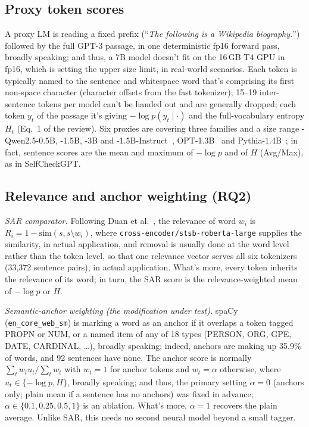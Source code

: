\documentclass[acmsmall,screen,review,nonacm]{acmart}
\begin{document}
\subsection{Proxy token scores}
A proxy LM is reading a fixed prefix (\textquotedblleft\textit{The following is a Wikipedia biography.}\textquotedblright) followed by the full GPT-3 passage, in one deterministic fp16 forward pass, broadly speaking; and thus, a 7B model doesn't fit on the 16\,GB T4 GPU in fp16, which is setting the upper size limit, in real-world scenarios. Each token is typically named to the sentence and whitespace word that's comprising its first non-space character (character offsets from the fast tokenizer); 15--19 inter-sentence tokens per model can't be handed out and are generally dropped; each token $y_t$ of the passage it's giving $-\log p(y_t\mid\cdot)$ and the full-vocabulary entropy $H_t$ (Eq.~1 of the review). Six proxies are covering three families and a size range - Qwen2.5-0.5B, -1.5B, -3B and -1.5B-Instruct~\cite{qwen2025qwen25}, OPT-1.3B~\cite{zhang2022opt} and Pythia-1.4B~\cite{biderman2023pythia}; in fact, sentence scores are the mean and maximum of $-\log p$ and of $H$ (Avg/Max), as in SelfCheckGPT.

\subsection{Relevance and anchor weighting (RQ2)}
\emph{SAR comparator.} Following Duan et al.~\cite{duan2024shifting}, the relevance of word $w_i$ is $R_i = 1 - \mathrm{sim}(s, s\setminus w_i)$, where \nolinkurl{cross-encoder/stsb-roberta-large} supplies the similarity, in actual application, and removal is usually done at the word level rather than the token level, so that one relevance vector serves all six tokenizers (33{,}372 sentence pairs), in actual application. What's more, every token inherits the relevance of its word; in turn, the SAR score is the relevance-weighted mean of $-\log p$ or $H$.

\emph{Semantic-anchor weighting (the modification under test).} spaCy~\cite{honnibal2020spacy} (\texttt{en\_core\_web\_sm}) is marking a word as an anchor if it overlaps a token tagged PROPN or NUM, or a named item of any of 18 types (PERSON, ORG, GPE, DATE, CARDINAL, \ldots), broadly speaking; indeed, anchors are making up 35.9\% of words, and 92 sentences have none. The anchor score is normally $\sum_t w_t u_t / \sum_t w_t$ with $w_t = 1$ for anchor tokens and $w_t=\alpha$ otherwise, where $u_t \in \{-\log p, H\}$, broadly speaking; and thus, the primary setting $\alpha = 0$ (anchors only; plain mean if a sentence has no anchors) was fixed in advance; $\alpha \in \{0.1, 0.25, 0.5, 1\}$ is an ablation. What's more, $\alpha=1$ recovers the plain average. Unlike SAR, this needs no second neural model beyond a small tagger.
\end{document}
